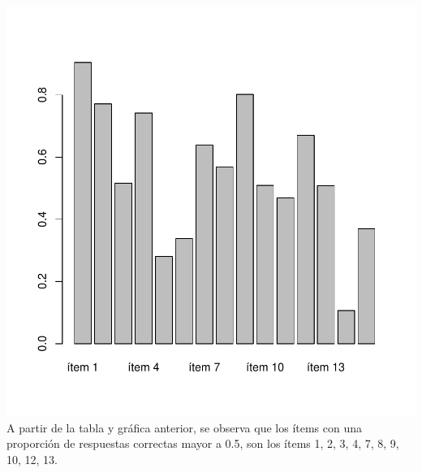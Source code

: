 \documentclass{article}
\begin{document}
\includegraphics{Documento_de_prueba-003}
A partir de la tabla y gráfica anterior, se observa que los ítems con una proporción de respuestas correctas mayor a 0.5, son los ítems 1, 2, 3, 4, 7, 8, 9, 10, 12, 13.  
\end{document}
